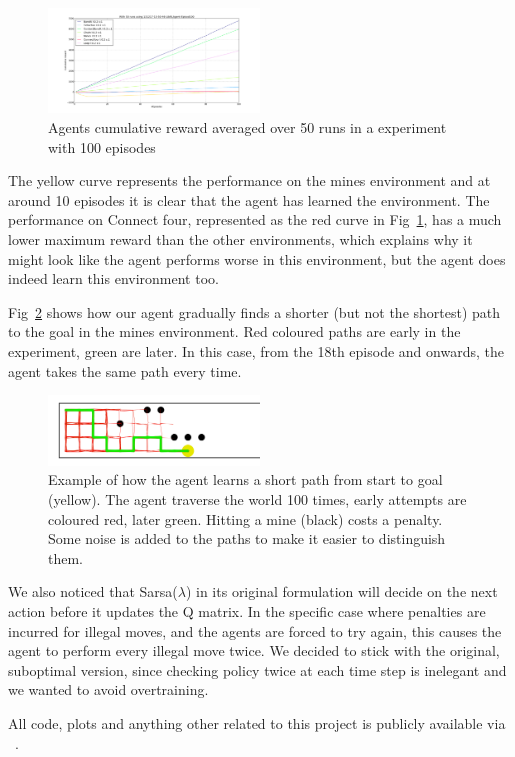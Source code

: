 \begin{figure}[h!]
    \centering
    \includegraphics[width=0.5\textwidth]{../data/100episodes_50runs.png}
    \caption{Agents cumulative reward averaged over 50 runs in a experiment with 100 episodes}
    \label{fig:cumreward}
\end{figure} 
The yellow curve represents the performance on the mines environment and at around 10 episodes it is clear that the agent has learned the environment. The performance on Connect four, represented as the red curve
in Fig~\ref{fig:cumreward}, has a much lower maximum reward than the other
environments, which explains why it might look like the agent performs worse in this environment, but the agent does indeed learn this environment too.

Fig~\ref{fig:mineslearning} shows how our agent gradually finds a shorter (but not the shortest) path to the goal in the mines environment. Red coloured paths are early in the experiment, green are later. In this case, from the 18th episode and onwards, the agent takes the same path every time.

\begin{figure}[h]
    \centering
    \includegraphics[width=0.5\textwidth]{../data/minPlot.png}
    \caption{Example of how the agent learns a short path from start to goal (yellow). The agent traverse the world 100 times, early attempts are coloured red, later green. Hitting a mine (black) costs a penalty. Some noise is added to the paths to make it easier to distinguish them.}
    \label{fig:mineslearning}
\end{figure} 

We also noticed that Sarsa($\lambda$) in its original formulation will decide on the next action before it updates the Q matrix. In the specific case where penalties are incurred for illegal moves, and the agents are forced to try again, this causes the agent to perform every illegal move twice. We decided to stick with the original, suboptimal version, since checking policy twice at each time step is inelegant and we wanted to avoid overtraining.

All code, plots and anything other related to this project is publicly available via ~\cite{githubrepo}.
